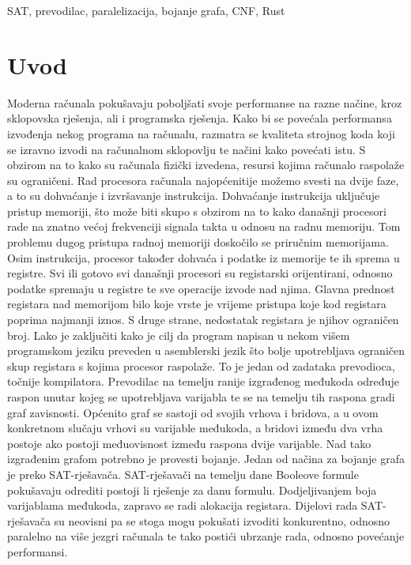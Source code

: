 \documentclass[hidelinks, conference]{IEEEtran}
\begin{document}
\begin{IEEEkeywords}
SAT, prevodilac, paralelizacija, bojanje grafa, CNF, Rust
\end{IEEEkeywords}

\section{Uvod}
Moderna računala pokušavaju poboljšati svoje performanse na razne načine, kroz sklopovska rješenja, ali i programska rješenja. Kako bi se povećala performansa izvođenja nekog programa na računalu, razmatra se kvaliteta strojnog koda koji se izravno izvodi na računalnom sklopovlju te načini kako povećati istu. S obzirom na to kako su računala fizički izvedena, resursi kojima računalo raspolaže su ograničeni. Rad procesora računala najopćenitije možemo svesti na dvije faze, a to su dohvaćanje i izvršavanje instrukcija. Dohvaćanje instrukcija uključuje pristup memoriji, što može biti skupo s obzirom na to kako današnji procesori rade na znatno većoj frekvenciji signala takta u odnosu na radnu memoriju. Tom problemu dugog pristupa radnoj memoriji doskočilo se priručnim memorijama. Osim instrukcija, procesor također dohvaća i podatke iz memorije te ih sprema u registre. Svi ili gotovo svi današnji procesori su registarski orijentirani, odnosno podatke spremaju u registre te sve operacije izvode nad njima. Glavna prednost registara nad memorijom bilo koje vrste je vrijeme pristupa koje kod registara poprima najmanji iznos. S druge strane, nedostatak registara je njihov ograničen broj. Lako je zaključiti kako je cilj da program napisan u nekom višem programskom jeziku preveden u asemblerski jezik što bolje upotrebljava ograničen skup registara s kojima procesor raspolaže. To je jedan od zadataka prevodioca, točnije kompilatora. Prevodilac na temelju ranije izgrađenog međukoda određuje raspon unutar kojeg se upotrebljava varijabla te se na temelju tih raspona gradi graf zavisnosti. Općenito graf se sastoji od svojih vrhova i bridova, a u ovom konkretnom slučaju vrhovi su varijable međukoda, a bridovi između dva vrha postoje ako postoji međuovisnost između raspona dvije varijable. Nad tako izgrađenim grafom potrebno je provesti bojanje. Jedan od načina za bojanje grafa je preko SAT-rješavača. SAT-rješavači na temelju dane Booleove formule pokušavaju odrediti postoji li rješenje za danu formulu. Dodjeljivanjem boja varijablama međukoda, zapravo se radi alokacija registara. Dijelovi rada SAT-rješavača su neovisni pa se stoga mogu pokušati izvoditi konkurentno, odnosno paralelno na više jezgri računala te tako postići ubrzanje rada, odnosno povećanje performansi.
\end{document}
